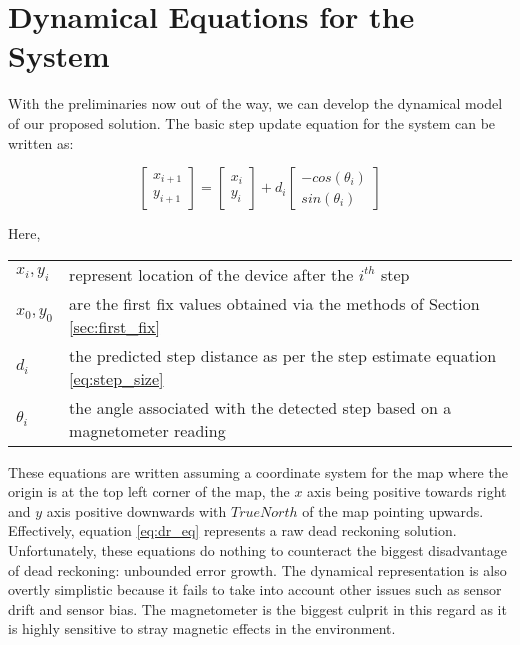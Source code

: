 \documentclass[10pt,journal,letterpaper,compsoc]{IEEEtran}
\begin{document}
\section{Dynamical Equations for the System}

With the preliminaries now out of the way, we can develop the dynamical model
of our proposed solution. The basic step update equation for the system 
can be written as:

\begin{equation}\label{eq:dr_eq}
\begin{bmatrix}x_{i+1}\\
y_{i+1}
\end{bmatrix} = \begin{bmatrix}x_{i}\\
y_{i}
\end{bmatrix}  + d{}_{i} \begin{bmatrix}-cos(\theta_{i})\\
sin(\theta_{i})
\end{bmatrix} 
\end{equation}

Here,\\
\begin{tabular}{p{1in} p{4in}}
$x_i, y_i$          &   represent location of the device after the $i^{th}$ step\\
$x_0, y_0$          &   are the first fix values obtained via the methods of Section \ref{sec:first_fix}\\
$d_i$               &   the predicted step distance as per the step estimate equation \eqref{eq:step_size}\\
$\theta_i$          &   the angle associated with the detected step based on a magnetometer reading\\
\end{tabular}

These equations are written assuming a coordinate system for the map where the 
origin is at the top left corner of the map, the $x$ axis being
positive towards right and $y$ axis positive downwards with $TrueNorth$ of the map
pointing upwards. Effectively, equation \eqref{eq:dr_eq} represents a raw dead reckoning
solution. Unfortunately, these equations do nothing to counteract the biggest
disadvantage of dead reckoning: unbounded error growth. The dynamical
representation is also overtly simplistic because it fails to take into account
other issues such as sensor drift and sensor bias. The magnetometer is the
biggest culprit in this regard as it is highly sensitive to stray magnetic
effects in the environment.
\end{document}
